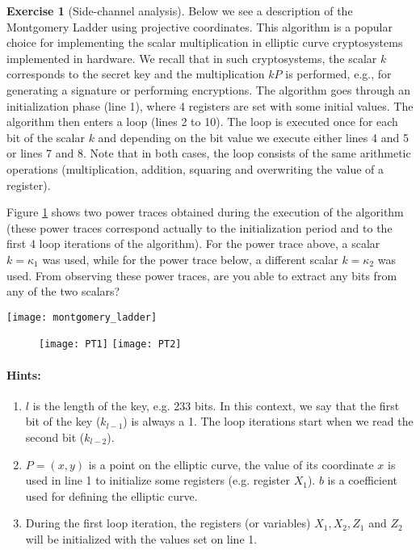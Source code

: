 \documentclass[envcountsame,runningheads,notitlepage]{../llncs}
\theoremstyle{definition}
\newtheorem{graded}[crossed]{Exercise}
\begin{document}
\begin{graded}[Side-channel analysis]
Below we see a description of the Montgomery Ladder using projective coordinates. This algorithm is a popular choice for implementing the scalar multiplication in elliptic curve cryptosystems implemented in hardware. We recall that in such cryptosystems, the scalar $k$ corresponds to the secret key and the multiplication $kP$ is performed, e.g., for generating a signature or performing encryptions. The algorithm goes through an initialization phase (line 1), where 4 registers are set with some initial values.
The algorithm then enters a loop (lines 2 to 10). The loop is executed once for each bit of the scalar $k$ and depending on the bit value we execute either lines 4 and 5 or lines 7 and 8. Note that in both cases, the loop consists of the same arithmetic operations (multiplication, addition, squaring and overwriting the value of a register).

Figure \ref{fig:pt1} shows two power traces obtained during the execution of the algorithm (these power traces correspond actually to the initialization period and to the first 4 loop iterations of the algorithm). For the power trace above, a scalar $k = \kappa_1$ was used, while for the power trace below, a different scalar $k = \kappa_2$ was used. From observing these power traces, are you able to extract any bits from any of the two scalars?

\texttt{[image: montgomery\_ladder]}

\begin{figure}
\texttt{[image: PT1]}
\texttt{[image: PT2]}
\end{figure}\label{fig:pt1}

\paragraph{Hints:}
\begin{enumerate}
\item $l$ is the length of the key, e.g. 233 bits. In this context, we say that the first bit of the key ($k_{l-1}$) is always a 1. The loop iterations start when we read the second bit ($k_{l-2}$).

\item $P=(x,y)$ is a point on the elliptic curve, the value of its coordinate $x$ is used in line 1 to initialize some registers (e.g. register $X_1$). $b$ is a coefficient used for defining the elliptic curve.

\item During the first loop iteration, the registers (or variables) $X_1,X_2,Z_1$ and $Z_2$ will be initialized with the values set on line 1.


\end{enumerate}
\end{graded}
\end{document}
